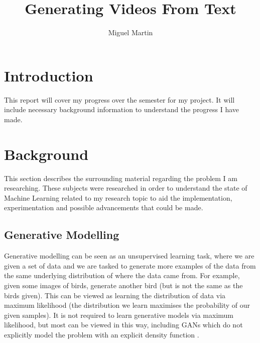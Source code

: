 \documentclass{article}
\begin{document}
\author{Miguel Martin}
\title{Generating Videos From Text}

%
%
%
%
%
%



\maketitle
\tableofcontents
\newpage

\section{Introduction} 

This report will cover my progress over the semester for my project. It will include necessary background information to understand
the progress I have made. 

\section{Background}

This section describes the surrounding material regarding the problem I am
researching. These subjects were researched in order to understand the state of Machine Learning related to my research topic to aid the implementation,
experimentation and possible advancements that could be made.

\subsection{Generative Modelling}

Generative modelling can be seen as an unsupervised learning task, where we are given a set of data and we are
tasked to generate more examples of the data from the same underlying distribution of where the data came from. For example, given some images of birds, generate another bird (but is not the same as the birds given). This can be viewed as learning the distribution of data via maximum likelihood (the distribution we learn
maximises the probability of our given samples). It is not required to learn generative models via maximum likelihood, but most can be viewed in this way, including GANs which do not explicitly model the problem
with an explicit density function \cite{goodfellow_nips_2016}.
\end{document}
